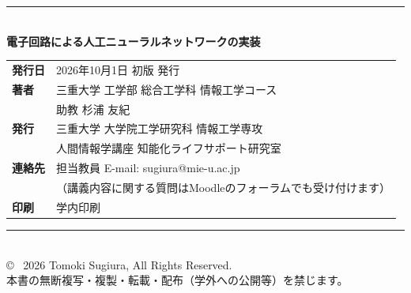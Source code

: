 \clearpage %
\thispagestyle{empty} %

\vspace*{\fill}

\begin{center}
    \rule{\textwidth}{1pt} \\[0.8em] %
    
    {\Large\bfseries 電子回路による人工ニューラルネットワークの実装} \\[1.5em]
    
    \begin{tabular}{ll}
        {\bfseries 発行日} & 2026年10月1日 \quad 初版 発行 \\[0.6em]
        {\bfseries 著者}   & 三重大学 工学部 総合工学科 情報工学コース \\
                           & 助教 \quad 杉浦 友紀 \\[0.6em]
        {\bfseries 発行}   & 三重大学 大学院工学研究科 情報工学専攻 \\
                           & 人間情報学講座 知能化ライフサポート研究室 \\
        {\bfseries 連絡先} & 担当教員 E-mail: sugiura@mie-u.ac.jp \\
                           & （講義内容に関する質問はMoodleのフォーラムでも受け付けます） \\[0.6em]
        {\bfseries 印刷}   & 学内印刷
    \end{tabular}
    
    \vspace{1.5em}
    \rule{\textwidth}{1pt} \\[0.8em] %
    
    \small
    \copyright ~ 2026 Tomoki Sugiura, All Rights Reserved. \\
    本書の無断複写・複製・転載・配布（学外への公開等）を禁じます。
\end{center}